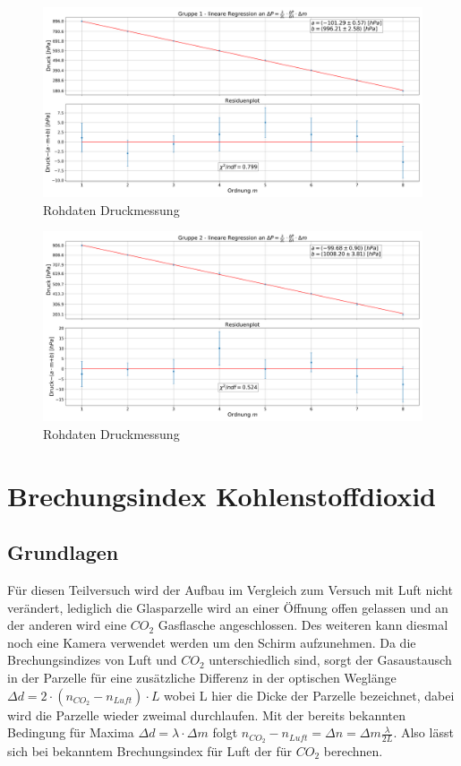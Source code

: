 \documentclass[a4paper, 11pt]{article}
\begin{document}
\begin{figure}[H]
	\hskip-2cm
	\includegraphics[scale=0.35]{./Bilder/Gruppe1_linReg.png}
	\caption{Rohdaten Druckmessung}
	\label{pic:Druckmessung}	
\end{figure}


\begin{figure}[H]
	\hskip-2cm
	\includegraphics[scale=0.35]{./Bilder/Gruppe2_linReg.png}
	\caption{Rohdaten Druckmessung}
	\label{pic:Druckmessung}	
\end{figure}



\section{Brechungsindex Kohlenstoffdioxid}
\subsection{Grundlagen}
Für diesen Teilversuch wird der Aufbau im Vergleich zum Versuch mit Luft nicht verändert, lediglich die Glasparzelle wird an einer Öffnung offen gelassen und an der anderen wird eine $CO_2$ Gasflasche angeschlossen. Des weiteren kann diesmal noch eine Kamera verwendet werden um den Schirm aufzunehmen. Da die Brechungsindizes von Luft und $CO_2$ unterschiedlich sind, sorgt der Gasaustausch in der Parzelle für eine zusätzliche Differenz in der optischen Weglänge $\Delta d=2\cdot (n_{CO_2}-n_{Luft}) \cdot L $ wobei L hier die Dicke der Parzelle bezeichnet, dabei wird die Parzelle wieder zweimal durchlaufen.
Mit der bereits bekannten Bedingung für Maxima $\Delta d= \lambda \cdot \Delta m$ folgt $n_{CO_2}-n_{Luft}=\Delta n= \Delta m \frac{\lambda}{2L}$. Also lässt sich bei bekanntem Brechungsindex für Luft der für $CO_2$ berechnen.
\end{document}
